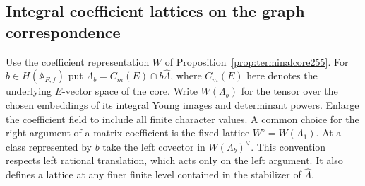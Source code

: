 \documentclass[a4paper,11pt]{article}
\theoremstyle{definition}
\theoremstyle{remark}
\numberwithin{equation}{section}
\begin{document}
\subsection{Integral coefficient lattices on the graph correspondence}\label{nav:IX-44}
Use the coefficient representation \(W\) of
Proposition~\ref{prop:terminalcore255}. For \(b\in H(\mathbb A_{F,f})\)
put \(\Lambda_b=C_m(E)\cap b\widehat\Lambda\), where \(C_m(E)\)
here denotes the underlying \(E\)-vector space of the core.
Write \(W(\Lambda_b)\) for the tensor over the chosen embeddings
of its integral Young images and determinant powers. Enlarge the
coefficient field to include all finite character values. A common
choice for the right argument of a matrix coefficient is the fixed
lattice \(W^\circ=W(\Lambda_1)\). At a class represented by \(b\)
take the left covector in \(W(\Lambda_b)^\vee\).
This convention respects left rational translation, which acts
only on the left argument. It also defines a lattice at any finer
finite level contained in the stabilizer of \(\widehat\Lambda\).
\end{document}
